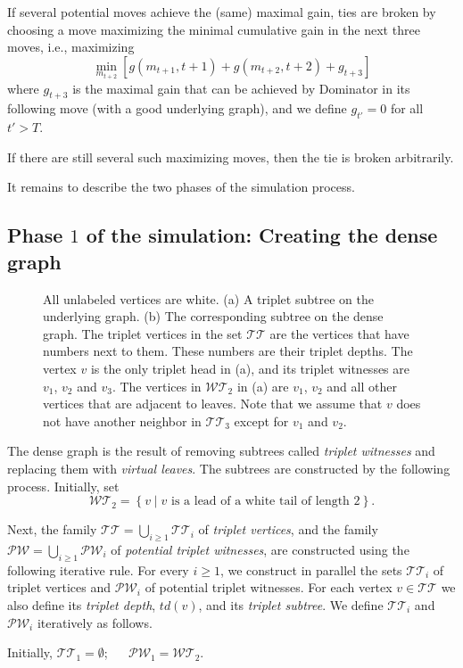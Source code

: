 \documentclass[11pt]{article}
\theoremstyle{definition}
\begin{document}
\begin{enumerate}
	If several potential moves achieve the (same) maximal gain, ties are broken by choosing a move maximizing the minimal cumulative gain in the next three moves, 
	i.e., maximizing 
	$$
		\min_{m_{t+2}}{[g(m_{t+1}, t+1) + g(m_{t+2}, t+2) + g_{t+3}]} 
	$$
	where $g_{t+3}$ is the maximal gain that can be achieved by Dominator in its following move (with a good underlying graph), and we define $g_{t'} = 0$ for all $t' > T$.
	
	If there are still several such maximizing moves, then the tie is broken arbitrarily.
\end{enumerate}

It remains to describe the two phases of the simulation process.

\subsection{Phase $1$ of the simulation: Creating the dense graph}
\label{sub:dense_graph}

\begin{figure}[thbp]
  \caption{\sf All unlabeled vertices are white.
	      (a) A triplet subtree on the underlying graph. 
	      (b) The corresponding subtree on the dense graph. The triplet vertices in the set $\mathcal{TT}$ are the vertices that have numbers next to them. These numbers are their triplet depths.
	      The vertex $v$ is the only triplet head in (a), and its triplet witnesses are $v_1$, $v_2$ and $v_3$.
	      The vertices in $\mathcal{WT}_2$ in (a) are $v_1$, $v_2$ and all other vertices that are adjacent to leaves.
	      Note that we assume that $v$ does not have another neighbor in $\mathcal{TT}_3$ except for $v_1$ and $v_2$.
	     }
  \medskip
  \centering
  \label{fig:t1_vertex}
\end{figure}

The dense graph is the result of removing subtrees called \emph{triplet witnesses} and replacing them with \emph{virtual leaves}.
The subtrees are constructed by the following process. 
Initially, set 
$$\mathcal{WT}_2 = \left\{ v \mid v \textrm{ is a lead of a white tail of length }2 \right\}.$$

Next,
the family $\mathcal{TT} = \bigcup_{i \geq 1} \mathcal{TT}_i$ of \emph{triplet vertices}, 
and the family $\mathcal{PW} = \bigcup_{i \geq 1} \mathcal{PW}_i$ of \emph{potential triplet witnesses},
are constructed using the following iterative rule.
For every $i \geq 1$, 
we construct in parallel the sets $\mathcal{TT}_i$ of triplet vertices and $\mathcal{PW}_i$ of potential triplet witnesses.
For each vertex $v \in \mathcal{TT}$ we also define its \emph{triplet depth}, $td(v)$, and its \emph{triplet subtree}.
We define $\mathcal{TT}_i$ and $\mathcal{PW}_i$ iteratively as follows.
\bigskip
\par\noindent
Initially,
$\mathcal{TT}_1 = \emptyset$; ~~
$\mathcal{PW}_1 = \mathcal{WT}_2$.
\end{document}
